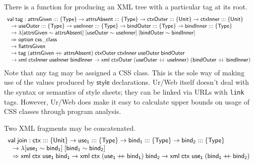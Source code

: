 \documentclass{article}
\newcommand{\mt}[1]{\mathsf{#1}}
\newcommand{\rc}{+ \hspace{-.075in} + \;}
\begin{document}
There is a function for producing an XML tree with a particular tag at its root.
$$\begin{array}{l}
  \mt{val} \; \mt{tag} : \mt{attrsGiven} ::: \{\mt{Type}\} \to \mt{attrsAbsent} ::: \{\mt{Type}\} \to \mt{ctxOuter} ::: \{\mt{Unit}\} \to \mt{ctxInner} ::: \{\mt{Unit}\} \\
  \hspace{.1in} \to \mt{useOuter} ::: \{\mt{Type}\} \to \mt{useInner} ::: \{\mt{Type}\} \to \mt{bindOuter} ::: \{\mt{Type}\} \to \mt{bindInner} ::: \{\mt{Type}\} \\
  \hspace{.1in} \to \lambda [\mt{attrsGiven} \sim \mt{attrsAbsent}] \; [\mt{useOuter} \sim \mt{useInner}] \; [\mt{bindOuter} \sim \mt{bindInner}] \\
  \hspace{.1in} \Rightarrow \mt{option} \; \mt{css\_class} \\
  \hspace{.1in} \to \$\mt{attrsGiven} \\
  \hspace{.1in} \to \mt{tag} \; (\mt{attrsGiven} \rc \mt{attrsAbsent}) \; \mt{ctxOuter} \; \mt{ctxInner} \; \mt{useOuter} \; \mt{bindOuter} \\
  \hspace{.1in} \to \mt{xml} \; \mt{ctxInner} \; \mt{useInner} \; \mt{bindInner} \to \mt{xml} \; \mt{ctxOuter} \; (\mt{useOuter} \rc \mt{useInner}) \; (\mt{bindOuter} \rc \mt{bindInner})
\end{array}$$
Note that any tag may be assigned a CSS class.  This is the sole way of making use of the values produced by $\mt{style}$ declarations.  Ur/Web itself doesn't deal with the syntax or semantics of style sheets; they can be linked via URLs with \texttt{link} tags.  However, Ur/Web does make it easy to calculate upper bounds on usage of CSS classes through program analysis.

Two XML fragments may be concatenated.
$$\begin{array}{l}
  \mt{val} \; \mt{join} : \mt{ctx} ::: \{\mt{Unit}\} \to \mt{use_1} ::: \{\mt{Type}\} \to \mt{bind_1} ::: \{\mt{Type}\} \to \mt{bind_2} ::: \{\mt{Type}\} \\
  \hspace{.1in} \to \lambda [\mt{use_1} \sim \mt{bind_1}] \; [\mt{bind_1} \sim \mt{bind_2}] \\
  \hspace{.1in} \Rightarrow \mt{xml} \; \mt{ctx} \; \mt{use_1} \; \mt{bind_1} \to \mt{xml} \; \mt{ctx} \; (\mt{use_1} \rc \mt{bind_1}) \; \mt{bind_2} \to \mt{xml} \; \mt{ctx} \; \mt{use_1} \; (\mt{bind_1} \rc \mt{bind_2})
\end{array}$$
\end{document}
